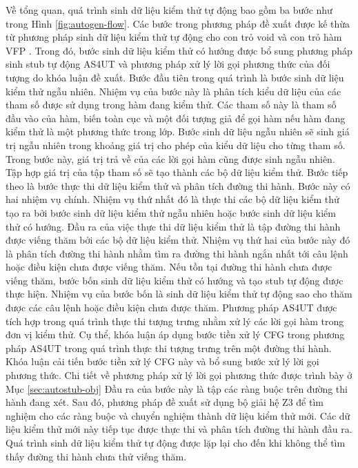 Về tổng quan, quá trình sinh dữ liệu kiểm thử tự động bao gồm ba bước như trong Hình \ref{fig:autogen-flow}. Các bước trong phương pháp đề xuất được kế thừa từ phương pháp sinh dữ liệu kiểm thử tự động cho con trỏ void và con trỏ hàm VFP \cite{TUNG2022106821}. Trong đó, bước sinh dữ liệu kiểm thử có hướng được bổ sung phương pháp sinh stub tự động AS4UT và phương pháp xử lý lời gọi phương thức của đối tượng do khóa luận đề xuất. Bước đầu tiên trong quá trình là bước sinh dữ liệu kiểm thử ngẫu nhiên. Nhiệm vụ của bước này là phân tích kiểu dữ liệu của các tham số được sử dụng trong hàm đang kiểm thử. Các tham số này là tham số đầu vào của hàm, biến toàn cục và một đối tượng giả để gọi hàm nếu hàm đang kiểm thử là một phương thức trong lớp. Bước sinh dữ liệu ngẫu nhiên sẽ sinh giá trị ngẫu nhiên trong khoảng giá trị cho phép của kiểu dữ liệu cho từng tham số. Trong bước này, giá trị trả về của các lời gọi hàm cũng được sinh ngẫu nhiên. Tập hợp giá trị của tập tham số sẽ tạo thành các bộ dữ liệu kiểm thử. Bước tiếp theo là bước thực thi dữ liệu kiểm thử và phân tích đường thi hành. Bước này có hai nhiệm vụ chính. Nhiệm vụ thứ nhất đó là thực thi các bộ dữ liệu kiểm thử tạo ra bởi bước sinh dữ liệu kiểm thử ngẫu nhiên hoặc bước sinh dữ liệu kiểm thử có hướng. Đầu ra của việc thực thi dữ liệu kiểm thử là tập đường thi hành được viếng thăm bởi các bộ dữ liệu kiểm thử. Nhiệm vụ thứ hai của bước này đó là phân tích đường thi hành nhằm tìm ra đường thi hành ngắn nhất tới câu lệnh hoặc điều kiện chưa được viếng thăm. Nếu tồn tại đường thi hành chưa được viếng thăm, bước bốn sinh dữ liệu kiểm thử có hướng và tạo stub tự động được thực hiện. Nhiệm vụ của bước bốn là sinh dữ liệu kiểm thử tự động sao cho thăm được các câu lệnh hoặc điều kiện chưa được thăm. Phương pháp AS4UT \cite{9953784} được tích hợp trong quá trình thực thi tượng trưng nhằm xử lý các lời gọi hàm trong đơn vị kiểm thử. Cụ thể, khóa luận áp dụng bước tiền xử lý CFG trong phương pháp AS4UT trong quá trình thực thi tượng trưng trên một đường thi hành. Khóa luận cải tiến bước tiền xử lý CFG này và bổ sung bước xử lý lời gọi phương thức. Chi tiết về phương pháp xử lý lời gọi phương thức được trình bày ở Mục \ref{sec:autostub-obj} Đầu ra của bước này là tập các ràng buộc trên đường thi hành đang xét. Sau đó, phương pháp đề xuất sử dụng bộ giải hệ Z3 để tìm nghiệm cho các ràng buộc và chuyển nghiệm thành dữ liệu kiểm thử mới. Các dữ liệu kiểm thử mới này tiếp tục được thực thi và phân tích đường thi hành đầu ra. Quá trình sinh dữ liệu kiểm thử tự động được lặp lại cho đến khi không thể tìm thấy đường thi hành chưa thử viếng thăm.

